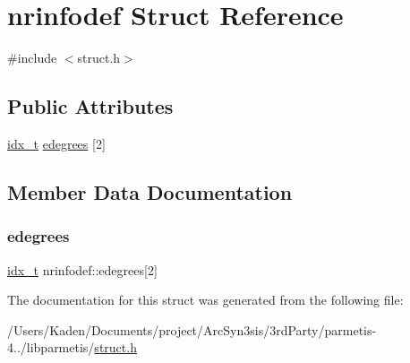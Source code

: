 \hypertarget{a00750}{}\section{nrinfodef Struct Reference}
\label{a00750}


{\ttfamily \#include $<$struct.\+h$>$}

\subsection*{Public Attributes}
\begin{DoxyCompactItemize}
\item 
\hyperlink{a00876_aaa5262be3e700770163401acb0150f52}{idx\+\_\+t} \hyperlink{a00750_ad0486695afd7e857406adc48fe520cdb}{edegrees} \mbox{[}2\mbox{]}
\end{DoxyCompactItemize}


\subsection{Member Data Documentation}
\mbox{\label{a00750_ad0486695afd7e857406adc48fe520cdb}} 
\subsubsection{\texorpdfstring{edegrees}{edegrees}}
{\footnotesize\ttfamily \hyperlink{a00876_aaa5262be3e700770163401acb0150f52}{idx\+\_\+t} nrinfodef\+::edegrees\mbox{[}2\mbox{]}}



The documentation for this struct was generated from the following file\+:\begin{DoxyCompactItemize}
\item 
/\+Users/\+Kaden/\+Documents/project/\+Arc\+Syn3sis/3rd\+Party/parmetis-\/4../libparmetis/\hyperlink{a00978}{struct.\+h}\end{DoxyCompactItemize}
